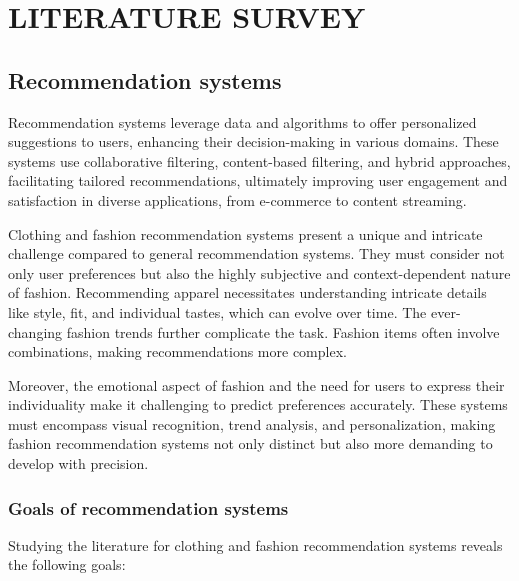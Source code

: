 \chapter{LITERATURE SURVEY}

\section{Recommendation systems}
	Recommendation systems leverage data and algorithms to offer personalized suggestions to users, enhancing their decision-making in various domains. These systems use collaborative filtering, content-based filtering, and hybrid approaches, facilitating tailored recommendations, ultimately improving user engagement and satisfaction in diverse applications, from e-commerce to content streaming.

	Clothing and fashion recommendation systems present a unique and intricate challenge compared to general recommendation systems. They must consider not only user preferences but also the highly subjective and context-dependent nature of fashion. Recommending apparel necessitates understanding intricate details like style, fit, and individual tastes, which can evolve over time. The ever-changing fashion trends further complicate the task. Fashion items often involve combinations, making recommendations more complex.

	Moreover, the emotional aspect of fashion and the need for users to express their individuality make it challenging to predict preferences accurately. These systems must encompass visual recognition, trend analysis, and personalization, making fashion recommendation systems not only distinct but also more demanding to develop with precision.

	\subsection{Goals of recommendation systems}
		Studying the literature for clothing and fashion recommendation systems reveals the following goals:

